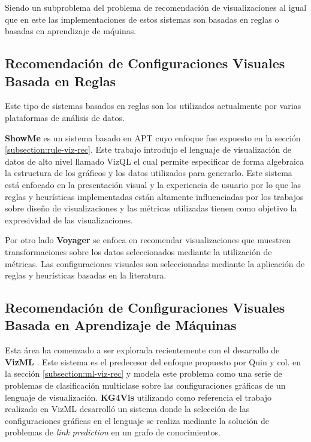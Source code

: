 Siendo un subproblema del problema de recomendaci\'on de visualizaciones al igual que en este las implementaciones
de estos sistemas son basadas en reglas o basadas en aprendizaje de m\'quinas.

\subsection{Recomendaci\'on de Configuraciones Visuales Basada en Reglas}

Este tipo de sistemas basados en reglas son los utilizados actualmente por varias plataformas
de an\'alisis de datos.

\textbf{ShowMe} \cite{mackinlay2007show} es un sistema basado en APT cuyo enfoque fue expuesto en la secci\'on \ref{subsection:rule-viz-rec}. Este
trabajo introdujo el lenguaje de visualizaci\'on de datos de alto nivel llamado VizQL \cite{hanrahan2006vizql} el cual permite
especificar de forma algebraica la estructura de los gr\'aficos y los datos utilizados para generarlo.
Este sistema est\'a enfocado en la presentaci\'on visual y la experiencia de usuario por lo que las reglas y heur\'isticas implementadas
est\'an altamente influenciadas por los trabajos sobre dise\~no de visualizaciones y las m\'etricas utilizadas tienen como objetivo la expresividad de las visualizaciones. 

Por otro lado \textbf{Voyager} \cite{wongsuphasawat2015voyager} se enfoca en recomendar visualizaciones que muestren transformaciones sobre los datos seleccionados mediante
la utilizaci\'on de m\'etricas. Las configuraciones visuales son seleccionadas mediante la aplicaci\'on de reglas y heur\'isticas basadas en la literatura.   

\subsection{Recomendaci\'on de Configuraciones Visuales Basada en Aprendizaje de M\'aquinas}

Esta \'area ha comenzado a ser explorada recientemente con el desarrollo de \textbf{VizML} \cite{hu2019vizml}. Este sistema es el predecesor
del enfoque propuesto por Quin y col. en la secci\'on \ref{subsection:ml-viz-rec} y modela este problema como una serie de problemas de
clasificaci\'on multiclase sobre las configuraciones gr\'aficas de un lenguaje de visualizaci\'on. \textbf{KG4Vis} \cite{li2021kg4vis} utilizando
como referencia el trabajo realizado en VizML desarroll\'o un sistema donde la selecci\'on de las configuraciones gr\'aficas en el lenguaje se realiza
mediante la soluci\'on de problemas de \textit{link prediction} en un grafo de conocimientos.








